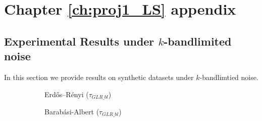 \chapter{\label{app:1-proj1}Chapter \ref{ch:proj1_LS} appendix}


\section{Experimental Results under $k$-bandlimited noise}
\label{app:Experiments_Bandlimited}
In this section we provide results on synthetic datasets under $k$-bandlimtied noise.

\begin{figure}%
    \centering
    \begin{subfigure}{0.3\columnwidth}
    \caption{Erdős–Rényi ($\tau_{GLR\_bl}$)}
    \label{tau_GLR_bl_er}
    \end{subfigure}
    \hfill
    \begin{subfigure}{0.3\columnwidth}
    \caption{Barabási-Albert ($\tau_{GLR\_bl}$)}%
    \label{tau_GLR_bl_BA}%
    \end{subfigure}
    \hfill%
    \begin{subfigure}{0.3\columnwidth}
    

\end{subfigure}
\end{figure}

